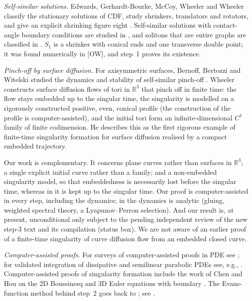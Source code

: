 \documentclass[11pt]{amsart}
\theoremstyle{definition}
\theoremstyle{remark}
\newcommand{\R}{\mathbb{R}}
\newcommand{\dref}[1]{[\textsf{#1}]}
\begin{document}
\emph{Self-similar solutions.} Edwards, Gerhardt-Bourke, McCoy, Wheeler and Wheeler classify the stationary solutions of CDF, study shrinkers, translators and rotators, and give an explicit shrinking figure eight \cite{EGMWW2015}. Self-similar solutions with contact-angle boundary conditions are studied in \cite{AsaiGiga2014}, and solitons that are entire graphs are classified in \cite{RybkaWheeler2024}. $S_1$ is a shrinker with conical ends and one transverse double point; it was found numerically in \dref{OW}, and step~1 proves its existence.

\emph{Pinch-off by surface diffusion.} For axisymmetric surfaces, Bernoff, Bertozzi and Witelski studied the dynamics and stability of self-similar pinch-off \cite{BernoffBertozziWitelski1998}. Wheeler \cite{Wheeler2026} constructs surface diffusion flows of tori in $\R^3$ that pinch off in finite time: the flow stays embedded up to the singular time, the singularity is modelled on a rigorously constructed positive, even, conical profile (the construction of the profile is computer-assisted), and the initial tori form an infinite-dimensional $C^1$ family of finite codimension. He describes this as the first rigorous example of finite-time singularity formation for surface diffusion realised by a compact embedded trajectory.

Our work is complementary. It concerns plane curves rather than surfaces in $\R^3$; a single explicit initial curve rather than a family; and a non-embedded singularity model, so that embeddedness is necessarily lost before the singular time, whereas in \cite{Wheeler2026} it is kept up to the singular time. Our proof is computer-assisted in every step, including the dynamics; in \cite{Wheeler2026} the dynamics is analytic (gluing, weighted spectral theory, a Lyapunov--Perron selection). And our result is, at present, unconditional only subject to the pending independent review of the new step-3 text and its compilation (status box). We are not aware of an earlier proof of a finite-time singularity of curve diffusion flow from an embedded closed curve.

\emph{Computer-assisted proofs.} For surveys of computer-assisted proofs in PDE see \cite{GomezSerrano2019}; for validated integration of dissipative and semilinear parabolic PDEs see, e.g., \cite{Zgliczynski2004,vandenBergBredenSheombarsing2024}. Computer-assisted proofs of singularity formation include the work of Chen and Hou on the 2D Boussinesq and 3D Euler equations with boundary \cite{ChenHou2022,ChenHou2023}. The Evans-function method behind step~2 goes back to \cite{AlexanderGardnerJones1990}; see \cite{KapitulaPromislow2013}.
\end{document}

